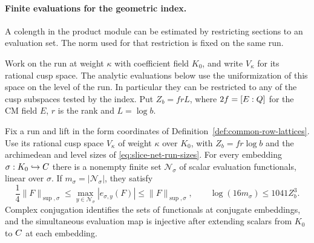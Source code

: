 \paragraph{Finite evaluations for the geometric index.}
\label{par:slice-evaluation-net}

A colength in the product module can be estimated by restricting sections to an evaluation set. The norm used for that restriction is fixed on the same run.

Work on the run at weight \(\kappa\) with coefficient field
\(K_0\), and write \(V_\kappa\) for its rational cusp space.
The analytic evaluations below use the uniformization of this
space on the level of the run. In particular they can be
restricted to any of the cusp subspaces tested by the index.
Put \(Z_b=frL\), where \(2f=[E:Q]\) for the CM field \(E\), \(r\)
is the rank and \(L=\log b\).

\begin{proposition}\label{prop:slice-evaluation-net}
Fix a run and lift in the form coordinates of
Definition~\ref{def:common-row-lattices}. Use its rational cusp space
\(V_\kappa\) of weight \(\kappa\) over \(K_0\), with \(Z_b=fr\log b\)
and the
archimedean and level sizes of \eqref{eq:slice-net-run-sizes}.
For every embedding \(\sigma:K_0\hookrightarrow C\) there is a nonempty finite set
\(\mathcal N_\sigma\) of scalar evaluation functionals, linear over \(\sigma\).
If \(m_\sigma=|\mathcal N_\sigma|\), they satisfy
\begin{equation}\label{eq:slice-net-size}
 \frac14\|F\|_{\sup,\sigma}\le
    \max_{y\in\mathcal N_\sigma}|e_{\sigma,y}(F)|
      \le\|F\|_{\sup,\sigma},\qquad
 \log(16m_\sigma)\le1041Z_b^3 .
\end{equation}
Complex conjugation identifies the sets of functionals at conjugate embeddings, and the simultaneous evaluation map is injective after extending
scalars from \(K_0\) to \(C\) at each embedding.

\end{proposition}

